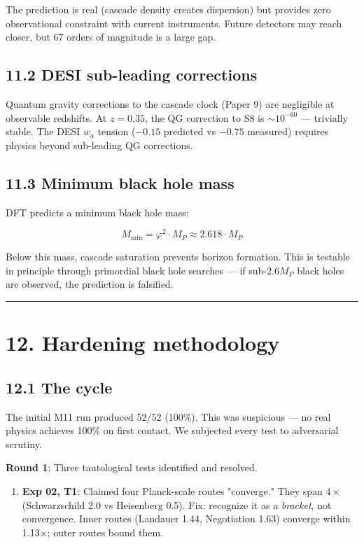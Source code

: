 \documentclass[11pt,a4paper]{article}
\providecommand{\tightlist}{\setlength{\itemsep}{0pt}\setlength{\parskip}{0pt}}
\begin{document}
The prediction is real (cascade density creates dispersion) but provides zero observational constraint with current instruments. Future detectors may reach closer, but 67 orders of magnitude is a large gap.

\subsection*{11.2 DESI sub-leading corrections}

Quantum gravity corrections to the cascade clock (Paper 9) are negligible at observable redshifts. At $z = 0.35$, the QG correction to S8 is $\sim 10^{-60}$ — trivially stable. The DESI $w_a$ tension ($-0.15$ predicted vs $-0.75$ measured) requires physics beyond sub-leading QG corrections.

\subsection*{11.3 Minimum black hole mass}

DFT predicts a minimum black hole mass:

\[M_{\text{min}} = \varphi^2 \cdot M_P \approx 2.618 \cdot M_P\]

Below this mass, cascade saturation prevents horizon formation. This is testable in principle through primordial black hole searches — if sub-$2.6 M_P$ black holes are observed, the prediction is falsified.

\begin{center}\rule{0.5\linewidth}{0.4pt}\end{center}

\section*{12. Hardening methodology}

\subsection*{12.1 The cycle}

The initial M11 run produced 52/52 (100\%). This was suspicious — no real physics achieves 100\% on first contact. We subjected every test to adversarial scrutiny.

\textbf{Round 1}: Three tautological tests identified and resolved.

\begin{enumerate}\tightlist
\item \textbf{Exp 02, T1}: Claimed four Planck-scale routes "converge." They span $4\times$ (Schwarzschild 2.0 vs Heisenberg 0.5). Fix: recognize it as a \emph{bracket}, not convergence. Inner routes (Landauer 1.44, Negotiation 1.63) converge within 1.13$\times$; outer routes bound them.
\end{enumerate}
\end{document}
